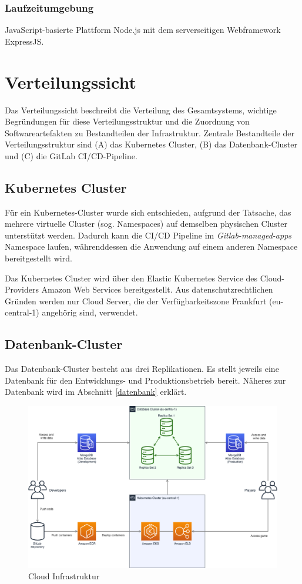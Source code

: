 \documentclass[letterpaper, 10 pt, conference]{ieeeconf}
\begin{document}
\subsubsection{Laufzeitumgebung}

JavaScript-basierte Plattform Node.js mit dem serverseitigen Webframework ExpressJS.

\section{Verteilungssicht}
Das Verteilungssicht beschreibt die Verteilung des Gesamtsystems,  wichtige Begründungen für diese Verteilungsstruktur und die Zuordnung von Softwareartefakten zu Bestandteilen der Infrastruktur. 
Zentrale Bestandteile der Verteilungsstruktur sind (A) das Kubernetes Cluster,  (B) das Datenbank-Cluster und (C) die GitLab CI/CD-Pipeline. 

\subsection{Kubernetes Cluster}

Für ein Kubernetes-Cluster wurde sich entschieden, aufgrund der Tatsache, das mehrere virtuelle Cluster (sog. Namespaces) auf demselben physischen Cluster unterstützt werden. Dadurch kann die CI/CD Pipeline im \textit{Gitlab-managed-apps} Namespace laufen, währenddessen die Anwendung auf einem anderen Namespace bereitgestellt wird.

Das Kubernetes Cluster wird über den Elastic Kubernetes Service des Cloud-Providers Amazon Web Services bereitgestellt.  Aus datenschutzrechtlichen Gründen werden nur Cloud Server, die der Verfügbarkeitszone Frankfurt (eu-central-1) angehörig sind, verwendet. 

\subsection{Datenbank-Cluster}
Das Datenbank-Cluster besteht aus drei Replikationen. Es stellt jeweils eine Datenbank für den Entwicklungs- und Produktionsbetrieb bereit. Näheres zur Datenbank wird im Abschnitt \ref{datenbank} erklärt.

\begin{figure}[thpb]
      \centering
      \includegraphics[scale=0.22]{images/infrastructure}
      \caption{Cloud Infrastruktur}
      \label{fig:infrastructure}
\end{figure}
\end{document}

